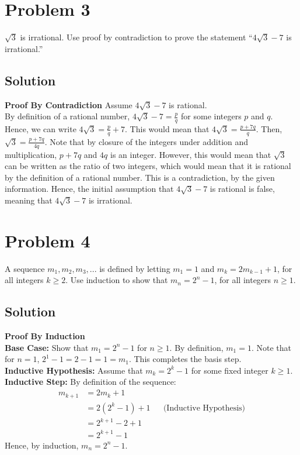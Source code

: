 \documentclass[table]{article}
\begin{document}
\section{Problem 3}
$\sqrt{3}$ is irrational. Use proof by contradiction to prove the statement ``$4\sqrt{3} - 7$ is irrational.''
\subsection{Solution}
\textbf{Proof By Contradiction}
Assume $4\sqrt{3} - 7$ is rational.\\
By definition of a rational number, $4\sqrt{3} - 7 = \frac{p}{q}$ for some integers $p$ and $q$. Hence, we can write $4\sqrt{3} = \frac{p}{q} + 7$. This would mean that $4\sqrt{3} = \frac{p+7q}{q}$. Then, $\sqrt{3} = \frac{p+7q}{4q}$. Note that by closure of the integers under addition and multiplication, $p+7q$ and $4q$ is an integer. However, this would mean that $\sqrt{3}$ can be written as the ratio of two integers, which would mean that it is rational by the definition of a rational number. This is a contradiction, by the given information. Hence, the initial assumption that $4\sqrt{3} - 7$ is rational is false, meaning that $4\sqrt{3} - 7$ is irrational.
\section{Problem 4}
A sequence $m_1, m_2, m_3, ...$ is defined by letting $m_1 = 1$ and $m_k = 2m_{k-1} + 1$, for all integers $k \geq 2$. Use induction to show that $m_n = 2^n - 1$, for all integers $n \geq 1$.
\subsection{Solution}
\textbf{Proof By Induction}\\
\textbf{Base Case:} Show that $m_1 = 2^n-1$ for $n \geq 1$. By definition, $m_1 = 1$. Note that for $n=1$, $2^1-1=2-1=1=m_1$. This completes the basis step.\\
\textbf{Inductive Hypothesis:} Assume that $m_k = 2^k-1$ for some fixed integer $k \geq 1$.\\
\textbf{Inductive Step:} By definition of the sequence:
\begin{align*}
m_{k+1}
&= 2m_k+1\\
&= 2(2^k-1)+1 && \text{(Inductive Hypothesis)}\\
&= 2^{k+1} - 2 + 1\\
&= 2^{k+1} - 1
\end{align*}
Hence, by induction, $m_n = 2^n-1$.
\end{document}
